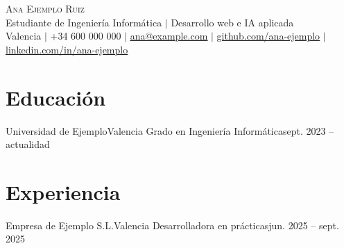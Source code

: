 




\begin{center}
    {\Huge \scshape Ana Ejemplo Ruiz} \\ \vspace{3pt}
    \small Estudiante de Ingeniería Informática $|$ Desarrollo web e IA aplicada \\ \vspace{2pt}
    \small Valencia $|$ +34 600 000 000 $|$
    \href{mailto:ana@example.com}{\underline{ana@example.com}} $|$
    \href{https://github.com/ana-ejemplo}{\underline{github.com/ana-ejemplo}} $|$
    \href{https://linkedin.com/in/ana-ejemplo}{\underline{linkedin.com/in/ana-ejemplo}}
\end{center}

\section{Educación}
  \resumeSubHeadingListStart
    \resumeSubheading
      {Universidad de Ejemplo}{Valencia}
      {Grado en Ingeniería Informática}{sept. 2023 -- actualidad}
      \resumeItemListStart
      \resumeItemListEnd
  \resumeSubHeadingListEnd

\section{Experiencia}
  \resumeSubHeadingListStart
    \resumeSubheading
      {Empresa de Ejemplo S.L.}{Valencia}
      {Desarrolladora en prácticas}{jun. 2025 -- sept. 2025}
      \resumeItemListStart
      \resumeItemListEnd
  \resumeSubHeadingListEnd

